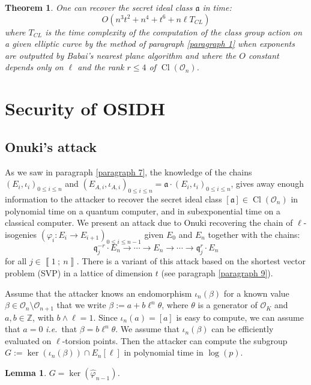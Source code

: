 \documentclass[a4paper,10pt]{report}
\theoremstyle{definition}
\theoremstyle{plain}
\newtheorem{lemma}[definition]{Lemma}
\newtheorem{theorem}[definition]{Theorem}
\theoremstyle{definition}
\newcommand{\ie}{\emph{i.e.}\ }
\newcommand{\Z}{\mathbb{Z}}
\newcommand{\mO}{\mathcal{O}}
\renewcommand{\i}[2]{\left\llbracket #1~;~#2\right\rrbracket}
\renewcommand{\(}{\left(}
\renewcommand{\)}{\right)}
\newcommand{\mf}[1]{\mathfrak{#1}}
\DeclareMathOperator{\Cl}{Cl}
\begin{document}
\begin{theorem}
One can recover the secret ideal class $\mf{a}$ in time:
\[O\(n^3t^2+n^4+t^6+n\ell T_{CL}\)\]
where $T_{CL}$ is the time complexity of the computation of the class group action on a given elliptic curve by the method of paragraph \ref{paragraph 1} when exponents are outputted by Babai's nearest plane algorithm and where the $O$ constant depends only on $\ell$ and the rank $r\leq 4$ of $\Cl(\mO_n)$.
\end{theorem}

\section{Security of OSIDH}

\subsection{Onuki's attack}

As we saw in paragraph \ref{paragraph 7}, the knowledge of the chains $(E_i,\iota_i)_{0\leq i\leq n}$ and $(E_{A,i},\iota_{A,i})_{0\leq i\leq n}=\mf{a}\cdot (E_i,\iota_i)_{0\leq i\leq n}$, gives away enough information to the attacker to recover the secret ideal class $[\mf{a}]\in\Cl(\mO_n)$ in polynomial time on a quantum computer, and in subexponential time on a classical computer.  We present an attack due to Onuki \cite[§ 6.3]{Onuki} recovering the chain of $\ell$-isogenies $(\varphi_i : E_i\longrightarrow E_{i+1})_{0\leq i\leq n-1}$  given $E_0$ and $E_n$ together with the chains:
\[\mf{q}_j^{-r}\cdot E_n\longrightarrow \cdots \longrightarrow E_n\longrightarrow \cdots\longrightarrow \mf{q}_j^{r}\cdot E_n\]
for all $j\in\i{1}{n}$. There is a variant of this attack based on the shortest vector problem (SVP) in a lattice of dimension $t$ (see paragraph \ref{paragraph 9}).

Assume that the attacker knows an endomorphism $\iota_n(\beta)$ for a known value $\beta\in\mO_n\setminus \mO_{n+1}$ that we write $\beta:=a+b\ell^n\theta$, where $\theta$ is a generator of $\mO_K$ and $a,b\in\Z$, with $b\wedge \ell=1$. Since $\iota_n(a)=[a]$ is easy to compute, we can assume that $a=0$ \ie that $\beta=b\ell^n\theta$. We assume that $\iota_n(\beta)$ can be efficiently evaluated on $\ell$-torsion points. Then the attacker can compute the subgroup $G:=\ker(\iota_n(\beta))\cap  E_n[\ell]$ in polynomial time in $\log(p)$. 

\begin{lemma}
$G=\ker(\widehat{\varphi}_{n-1})$.
\end{lemma}
\end{document}
